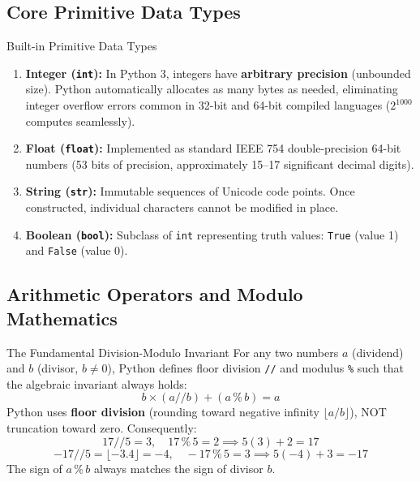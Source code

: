 \subsection{Core Primitive Data Types}

\begin{definitionbox}{Built-in Primitive Data Types}
\begin{enumerate}
    \item \textbf{Integer (\texttt{int}):} In Python 3, integers have \textbf{arbitrary precision} (unbounded size). Python automatically allocates as many bytes as needed, eliminating integer overflow errors common in 32-bit and 64-bit compiled languages ($2^{1000}$ computes seamlessly).
    \item \textbf{Float (\texttt{float}):} Implemented as standard IEEE 754 double-precision 64-bit numbers (53 bits of precision, approximately 15--17 significant decimal digits).
    \item \textbf{String (\texttt{str}):} Immutable sequences of Unicode code points. Once constructed, individual characters cannot be modified in place.
    \item \textbf{Boolean (\texttt{bool}):} Subclass of \texttt{int} representing truth values: \texttt{True} (value 1) and \texttt{False} (value 0).
\end{enumerate}
\end{definitionbox}

\subsection{Arithmetic Operators and Modulo Mathematics}

\begin{theorembox}{The Fundamental Division-Modulo Invariant}
For any two numbers $a$ (dividend) and $b$ (divisor, $b \neq 0$), Python defines floor division \texttt{//} and modulus \texttt{\%} such that the algebraic invariant always holds:
\begin{equation}
b \times (a \mathbin{/\!\!/} b) + (a \mathbin{\%} b) = a
\end{equation}
Python uses \textbf{floor division} (rounding toward negative infinity $\lfloor a/b \rfloor$), NOT truncation toward zero.
Consequently:
\begin{equation}
17 \mathbin{/\!\!/} 5 = 3, \quad 17 \mathbin{\%} 5 = 2 \implies 5(3) + 2 = 17
\end{equation}
\begin{equation}
-17 \mathbin{/\!\!/} 5 = \lfloor -3.4 \rfloor = -4, \quad -17 \mathbin{\%} 5 = 3 \implies 5(-4) + 3 = -17
\end{equation}
The sign of $a \mathbin{\%} b$ always matches the sign of divisor $b$.
\end{theorembox}

